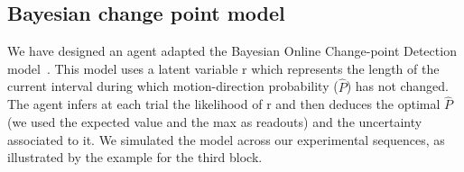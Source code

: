 \documentclass[profile,final,english, draft]{article}%
\newcommand{\citep}[1]{\parencite{#1}}
\begin{document}
\subsection{Bayesian change point model}

We have designed an agent adapted the Bayesian Online Change-point Detection model~\citep{AdamsMackay2007}. This model uses a latent variable r which represents the length of the current interval during which motion-direction probability ($\hat{P}$) has not changed. The agent infers at each trial the likelihood  of r and then deduces the optimal $\hat{P}$ (we used the expected value and the max as readouts) and the uncertainty associated to it. We simulated the model across our experimental sequences, as illustrated by the example for the third block.


%
%
%
%
\end{document}
